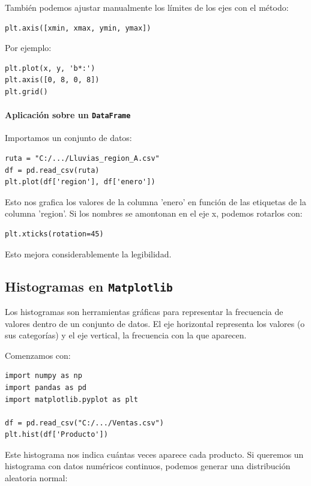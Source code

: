 \documentclass{article}
\theoremstyle{nonumberplain}
\begin{document}
También podemos ajustar manualmente los límites de los ejes con el método:

\begin{verbatim}
plt.axis([xmin, xmax, ymin, ymax])
\end{verbatim}

Por ejemplo:

\begin{verbatim}
plt.plot(x, y, 'b*:')
plt.axis([0, 8, 0, 8])
plt.grid()
\end{verbatim}

\paragraph{Aplicación sobre un \texttt{DataFrame}}

Importamos un conjunto de datos:

\begin{verbatim}
ruta = "C:/.../Lluvias_region_A.csv"
df = pd.read_csv(ruta)
plt.plot(df['region'], df['enero'])
\end{verbatim}

Esto nos grafica los valores de la columna 'enero' en función de las etiquetas de la columna 'region'. Si los nombres se amontonan en el eje x, podemos rotarlos con:

\begin{verbatim}
plt.xticks(rotation=45)
\end{verbatim}

Esto mejora considerablemente la legibilidad.

\subsection*{Histogramas en \texttt{Matplotlib}}

Los histogramas son herramientas gráficas para representar la frecuencia de valores dentro de un conjunto de datos. El eje horizontal representa los valores (o sus categorías) y el eje vertical, la frecuencia con la que aparecen.

Comenzamos con:

\begin{verbatim}
import numpy as np
import pandas as pd
import matplotlib.pyplot as plt

df = pd.read_csv("C:/.../Ventas.csv")
plt.hist(df['Producto'])
\end{verbatim}

Este histograma nos indica cuántas veces aparece cada producto. Si queremos un histograma con datos numéricos continuos, podemos generar una distribución aleatoria normal:
\end{document}
